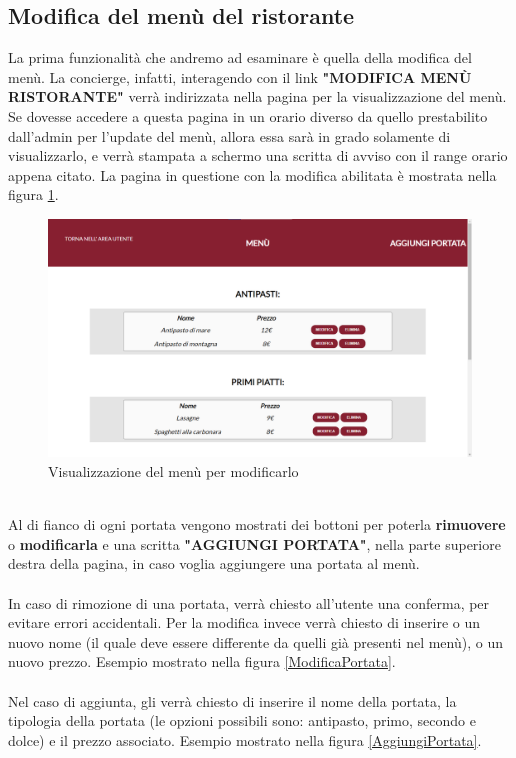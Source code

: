 \documentclass [a4paper, 12pt]{book}
\begin{document}
\subsection{Modifica del menù del ristorante}
La prima funzionalità che andremo ad esaminare è quella della modifica del menù. La concierge, infatti, interagendo con il link \textbf{"MODIFICA MENÙ RISTORANTE"} verrà indirizzata nella pagina per la visualizzazione del menù. Se dovesse accedere a questa pagina in un orario diverso da quello prestabilito dall'admin per l'update del menù, allora essa sarà in grado solamente di visualizzarlo, e verrà stampata a schermo una scritta di avviso con il range orario appena citato. La pagina in questione con la modifica abilitata è mostrata nella figura \ref{MenuStaff}.
\begin{figure}[!h]
\centering
\includegraphics[scale=0.3]{MenuStaff.png}
\caption{Visualizzazione del menù per modificarlo}
\label{MenuStaff}
\end{figure}\\
Al di fianco di ogni portata vengono mostrati dei bottoni per poterla \textbf{rimuovere} o \textbf{modificarla} e una scritta \textbf{"AGGIUNGI PORTATA"}, nella parte superiore destra della pagina, in caso voglia aggiungere una portata al menù.\\\\
In caso di rimozione di una portata, verrà chiesto all'utente una conferma, per evitare errori accidentali. Per la modifica invece verrà chiesto di inserire o un nuovo nome (il quale deve essere differente da quelli già presenti nel menù), o un nuovo prezzo. Esempio mostrato nella figura \ref{ModificaPortata}.\\\\
Nel caso di aggiunta, gli verrà chiesto di inserire il nome della portata, la tipologia della portata (le opzioni possibili sono: antipasto, primo, secondo e dolce) e il prezzo associato. Esempio mostrato nella figura \ref{AggiungiPortata}.\newpage
\end{document}
